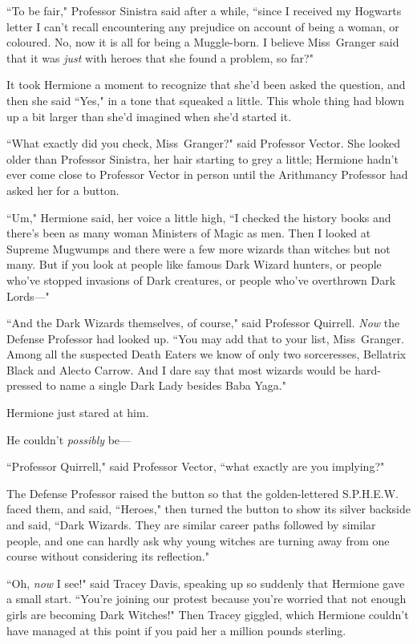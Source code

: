 ``To be fair," Professor Sinistra said after a while, ``since I received my Hogwarts letter I can't recall encountering any prejudice on account of being a woman, or coloured. No, now it is all for being a Muggle-born. I believe Miss~Granger said that it was \emph{just} with heroes that she found a problem, so far?"

It took Hermione a moment to recognize that she'd been asked the question, and then she said ``Yes," in a tone that squeaked a little. This whole thing had blown up a bit larger than she'd imagined when she'd started it.

``What exactly did you check, Miss~Granger?" said Professor Vector. She looked older than Professor Sinistra, her hair starting to grey a little; Hermione hadn't ever come close to Professor Vector in person until the Arithmancy Professor had asked her for a button.

``Um," Hermione said, her voice a little high, ``I checked the history books and there's been as many woman Ministers of Magic as men. Then I looked at Supreme Mugwumps and there were a few more wizards than witches but not many. But if you look at people like famous Dark Wizard hunters, or people who've stopped invasions of Dark creatures, or people who've overthrown Dark Lords—"

``And the Dark Wizards themselves, of course," said Professor Quirrell. \emph{Now} the Defense Professor had looked up. ``You may add that to your list, Miss~Granger. Among all the suspected Death Eaters we know of only two sorceresses, Bellatrix Black and Alecto Carrow. And I dare say that most wizards would be hard-pressed to name a single Dark Lady besides Baba Yaga."

Hermione just stared at him.

He couldn't \emph{possibly} be—

``Professor Quirrell," said Professor Vector, ``what exactly are you implying?"

The Defense Professor raised the button so that the golden-lettered S.P.H.E.W. faced them, and said, ``Heroes," then turned the button to show its silver backside and said, ``Dark Wizards. They are similar career paths followed by similar people, and one can hardly ask why young witches are turning away from one course without considering its reflection."

``Oh, \emph{now} I see!" said Tracey Davis, speaking up so suddenly that Hermione gave a small start. ``You're joining our protest because you're worried that not enough girls are becoming Dark Witches!" Then Tracey giggled, which Hermione couldn't have managed at this point if you paid her a million pounds sterling.

